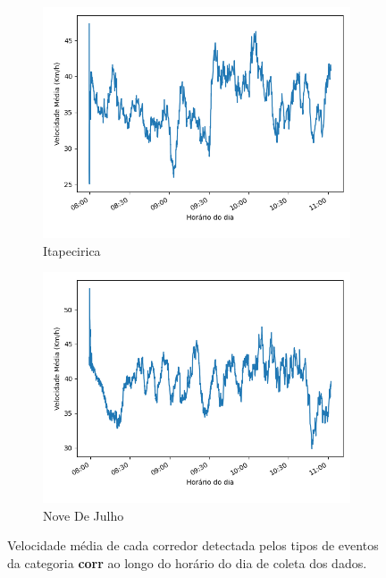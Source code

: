 \begin{figure}[ht]
\begin{subfigure}{.45\textwidth}
  \label{fig::avg_speed_Ponte_Baixa}
\end{subfigure}
\centering
\begin{subfigure}{.45\textwidth}
  \centering
\includegraphics[width=\textwidth]{figuras/detect_graphics/avg_speed_7-dez-su-corr_Itapecerica.png}
\caption{Itapecirica}
\label{fig::avg_speed_Itapecirica}
\end{subfigure}%
\begin{subfigure}{.45\textwidth}
 \centering
 \includegraphics[width=\textwidth]{figuras/detect_graphics/avg_speed_7-dez-su-corr_NoveDeJulho.png}
 \caption{Nove De Julho}
 \label{fig::avg_speed_Nove_de_Julho}
\end{subfigure}
 \caption{Velocidade média de cada corredor detectada pelos tipos de eventos da categoria \textbf{corr} ao longo do horário do dia de coleta dos dados.}
\end{figure}
